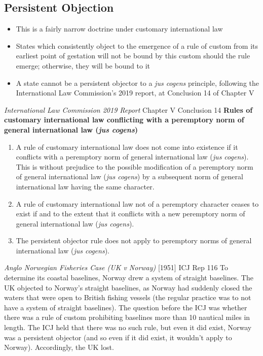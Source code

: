\subsection{Persistent Objection}
\begin{itemize}
    \item This is a fairly narrow doctrine under customary international law
    \item States which consistently object to the emergence of a rule of custom from its earliest point of gestation will not be bound by this custom should the rule emerge; otherwise, they will be bound to it
    \item A state cannot be a persistent objector to a \textit{jus cogens} principle, following the International Law Commission's 2019 report, at Conclusion 14 of Chapter V
\end{itemize}

\begin{conventiondetails}{\textit{International Law Commission 2019 Report} Chapter V Conclusion 14}\label{report:2019 ILC Conc. 14}
    \flushleft
    \textbf{Rules of customary international law conflicting with a peremptory norm of general international law (\textit{jus cogens})}

    \begin{enumerate}
        \item A rule of customary international law does not come into existence if it conflicts with a peremptory norm of general international law (\textit{jus cogens}). This is without prejudice to the possible modification of a peremptory norm of general international law (\textit{jus cogens}) by a subsequent norm of general international law having the same character.
        \item A rule of customary international law not of a peremptory character ceases to exist if and to the extent that it conflicts with a new peremptory norm of general international law (\textit{jus cogens}).
        \item The persistent objector rule does not apply to peremptory norms of general international law (\textit{jus cogens}).
    \end{enumerate}
\end{conventiondetails}

\begin{casedetails}{\textit{Anglo Norwegian Fisheries Case (UK v Norway)} [1951] ICJ Rep 116}
    \flushleft
    To determine its coastal baselines, Norway drew a system of straight baselines. The UK objected to Norway's straight baselines, as Norway had suddenly closed the waters that were open to British fishing vessels (the regular practice was to not have a system of straight baselines). The question before the ICJ was whether there was a rule of custom prohibiting baselines more than 10 nautical miles in length. The ICJ held that there was no such rule, but even it did exist, Norway was a persistent objector (and so even if it did exist, it wouldn't apply to Norway). Accordingly, the UK lost.
\end{casedetails}

